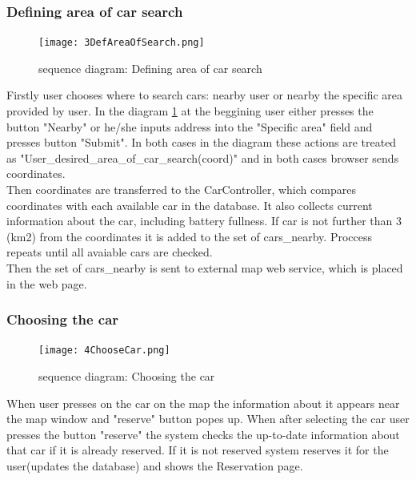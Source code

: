 \documentclass[12pt, letterpaper]{article}
\begin{document}
\subsubsection{Defining area of car search}
\begin{figure}[H]
\centering
\texttt{[image: 3DefAreaOfSearch.png]} 
\caption{sequence diagram: Defining area of car search}
\label{fig:3DefAreaOfSearch}
\end{figure}
\newpage
Firstly user chooses where to search cars: nearby user or nearby the specific area provided by user. In the diagram \ref{fig:3DefAreaOfSearch} at the beggining user either presses the button "Nearby" or he/she inputs address into the "Specific area" field and presses button "Submit". In both cases in the diagram these actions are treated as "User\_desired\_area\_of\_car\_search(coord)" and in both cases browser sends coordinates. \\
Then coordinates are transferred to the CarController, which compares coordinates with each available car in the database. It also collects current information about the car, including battery fullness.  If car is not further than 3 (km2) from the coordinates it is added to the set of cars\_nearby. Proccess repeats until all avaiable cars are checked. \\
Then the set of cars\_nearby is sent to external map web service, which is placed in the web page.  
\newpage
\subsubsection{Choosing the car}
\begin{figure}[H]
\centering
\texttt{[image: 4ChooseCar.png]} 
\caption{sequence diagram: Choosing the car}
\label{fig:4ChooseCar}
\end{figure}
\newpage
When user presses on the car on the map the information about it appears near the map window and "reserve" button popes up. When after selecting the car user presses the button "reserve" the system checks the up-to-date information about that car if it is already reserved. If it is not reserved system reserves it for the user(updates the database) and shows the Reservation page.  
\newpage
\end{document}
